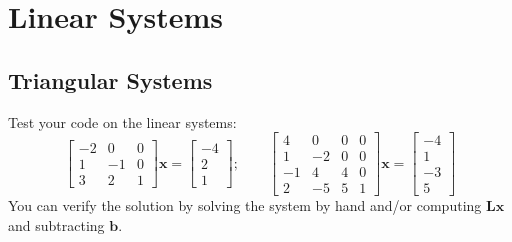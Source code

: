 \section{Linear Systems}
\subsection{Triangular Systems}

\begin{exercise}
    Test your code on the linear systems:
        \[ 
            \begin{bmatrix}
                -2 & 0 & 0 \\
                1 & -1 & 0 \\
                3 & 2 & 1 
            \end{bmatrix}
            \mathbf{x} = 
            \begin{bmatrix}
                -4 \\ 2 \\ 1
            \end{bmatrix};
            \qquad
            \begin{bmatrix}
            4 & 0 & 0 & 0 \\
            1 & -2 & 0 & 0 \\
            -1 & 4 & 4 & 0 \\
            2 & -5 & 5 & 1
            \end{bmatrix} 
            \mathbf{x} = \begin{bmatrix}
            -4 \\ 1 \\ -3 \\ 5
            \end{bmatrix}
        \]
    You can verify the solution by solving the system by hand and/or computing $\mathbf{L}\mathbf{x}$ and subtracting $\mathbf{b}$.
\end{exercise}

